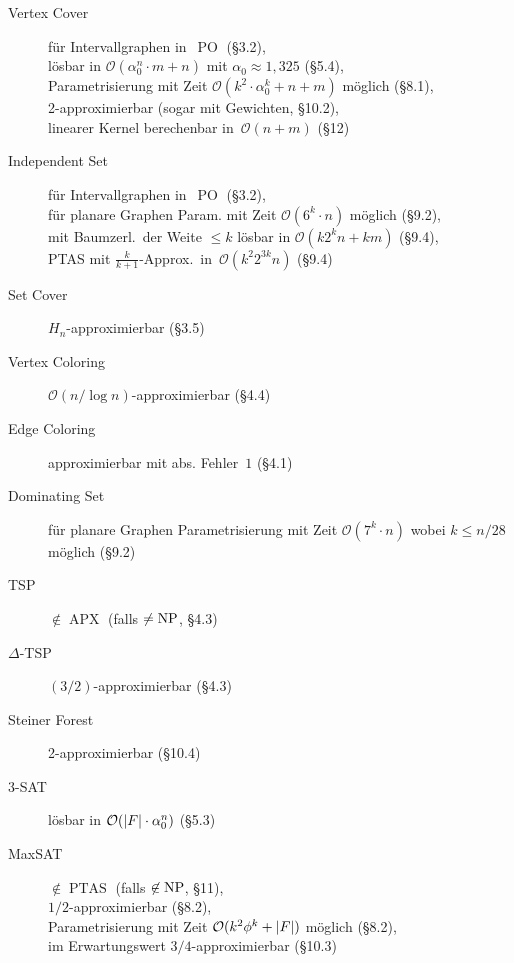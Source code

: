\documentclass{cheat-sheet}
\DeclareMathOperator{\PO}{PO} %
\DeclareMathOperator{\APX}{APX} %
\DeclareMathOperator{\NP}{NP} %
\let\P\relax %
\DeclareMathOperator{\P}{P} %
\DeclareMathOperator{\PTAS}{PTAS} %
\renewcommand{\O}{\mathcal{O}} %
\begin{document}
\begin{description}
  \item[Vertex Cover]
    für Intervallgraphen in~$\PO$ (§3.2), \\
    lösbar in $\O(\alpha_0^n \cdot m + n)$ mit $\alpha_0 \approx 1,325$ (§5.4), \\
    Parametrisierung mit Zeit $\O(k^2 \cdot \alpha_0^k + n + m)$ möglich (§8.1), \\
    2-approximierbar (sogar mit Gewichten, §10.2), \\
    linearer Kernel berechenbar in~$\O(n+m)$ (§12)

  \item[Independent Set]
    für Intervallgraphen in~$\PO$ (§3.2), \\
    für planare Graphen Param. mit Zeit $\O(6^k \cdot n)$ möglich (§9.2), \\
    mit Baumzerl.\ der Weite $\leq k$ lösbar in $\O(k 2^k n + k m)$ (§9.4), \\
    PTAS mit $\tfrac{k}{k+1}$-Approx.\ in~$\O(k^2 2^{3 k} n)$ (§9.4)

  \item[Set Cover]
    $H_n$-approximierbar (§3.5)

  \item[Vertex Coloring]
    $\O(n / \log n)$-approximierbar (§4.4)

  \item[Edge Coloring]
    approximierbar mit abs. Fehler~$1$ (§4.1)

  \item[Dominating Set]
    für planare Graphen Parametrisierung mit Zeit $\O(7^k \cdot n)$ wobei $k \leq n/28$ möglich (§9.2)

  \item[TSP]
    $\not\in \APX$ (falls $\P \neq \NP$, §4.3)

  \item[$\Delta$-TSP]
    $(3/2)$-approximierbar (§4.3)

  \item[Steiner Forest]
    2-approximierbar (§10.4)

  \item[3-SAT]
    lösbar in $\O(\abs{F} \cdot \alpha_0^n)$ (§5.3)

  \item[MaxSAT]
    $\not\in \PTAS$ (falls $\P \not \in \NP$, §11), \\
    $1/2$-approximierbar (§8.2), \\
    Parametrisierung mit Zeit $\O(k^2 \phi^k + \abs{F})$ möglich (§8.2), \\
    im Erwartungswert $3/4$-approximierbar (§10.3)


\end{description}
\end{document}
